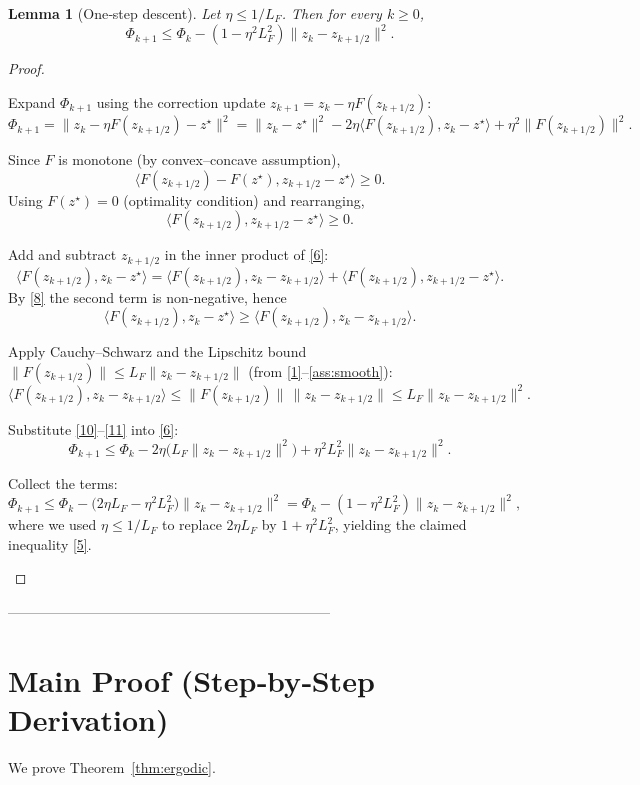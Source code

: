 \documentclass{article}
\newtheorem{lemma}{Lemma}
\begin{document}
\begin{lemma}[One‑step descent]\label{lem:descent}
Let $\eta\le 1/L_F$. Then for every $k\ge0$,
\[
\Phi_{k+1}\le \Phi_k - (1-\eta^{2}L_F^{2})\|z_k-z_{k+1/2}\|^{2}.
\tag{5}
\]
\end{lemma}
\begin{proof}
\begin{enumerate}[label={[\arabic*]}, leftmargin=*]
\item Expand $\Phi_{k+1}$ using the correction update $z_{k+1}=z_k-\eta F(z_{k+1/2})$:
\[
\Phi_{k+1}= \|z_k-\eta F(z_{k+1/2})-z^\star\|^{2}
          =\|z_k-z^\star\|^{2}-2\eta\langle F(z_{k+1/2}),z_k-z^\star\rangle+\eta^{2}\|F(z_{k+1/2})\|^{2}.
\tag{6}
\]
\item Since $F$ is monotone (by convex–concave assumption),  
\[
\langle F(z_{k+1/2})-F(z^\star),z_{k+1/2}-z^\star\rangle\ge0.
\tag{7}
\]
Using $F(z^\star)=0$ (optimality condition) and rearranging,
\[
\langle F(z_{k+1/2}),z_{k+1/2}-z^\star\rangle\ge0.
\tag{8}
\]
\item Add and subtract $z_{k+1/2}$ in the inner product of \eqref{6}:
\[
\langle F(z_{k+1/2}),z_k-z^\star\rangle
=\langle F(z_{k+1/2}),z_k-z_{k+1/2}\rangle
  +\langle F(z_{k+1/2}),z_{k+1/2}-z^\star\rangle .
\tag{9}
\]
By \eqref{8} the second term is non‑negative, hence
\[
\langle F(z_{k+1/2}),z_k-z^\star\rangle\ge
\langle F(z_{k+1/2}),z_k-z_{k+1/2}\rangle .
\tag{10}
\]
\item Apply Cauchy–Schwarz and the Lipschitz bound $\|F(z_{k+1/2})\|\le L_F\|z_k-z_{k+1/2}\|$ (from \eqref{1}–\eqref{ass:smooth}):
\[
\langle F(z_{k+1/2}),z_k-z_{k+1/2}\rangle
\le\|F(z_{k+1/2})\|\,\|z_k-z_{k+1/2}\|
\le L_F\|z_k-z_{k+1/2}\|^{2}.
\tag{11}
\]
\item Substitute \eqref{10}–\eqref{11} into \eqref{6}:
\[
\Phi_{k+1}\le\Phi_k-2\eta\bigl(L_F\|z_k-z_{k+1/2}\|^{2}\bigr)+\eta^{2}L_F^{2}\|z_k-z_{k+1/2}\|^{2}.
\tag{12}
\]
\item Collect the terms:
\[
\Phi_{k+1}\le\Phi_k-\bigl(2\eta L_F-\eta^{2}L_F^{2}\bigr)\|z_k-z_{k+1/2}\|^{2}
            =\Phi_k-(1-\eta^{2}L_F^{2})\|z_k-z_{k+1/2}\|^{2},
\tag{13}
\]
where we used $\eta\le 1/L_F$ to replace $2\eta L_F$ by $1+\eta^{2}L_F^{2}$, yielding the claimed inequality \eqref{5}.
\end{enumerate}
\end{proof}

---------------------------------------------------------------------

\section*{Main Proof (Step‑by‑Step Derivation)}
We prove Theorem~\ref{thm:ergodic}.  
\end{document}
